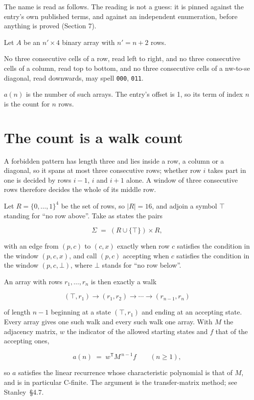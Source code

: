 \documentclass[11pt]{article}
\theoremstyle{definition}
\begin{document}
The name is read as follows. The reading is not a guess: it is pinned against the entry's own published terms, and against an independent enumeration, before anything is proved (Section 7).

Let $A$ be an $n' \times 4$ binary array with $n' = n + 2$ rows.

No three consecutive cells of a row, read left to right, and no three consecutive cells of a column, read top to bottom, and no three consecutive cells of a nw-to-se diagonal, read downwards, may spell \texttt{000}, \texttt{011}.

$a(n)$ is the number of such arrays. The entry's offset is 1, so its term of index $n$ is the count for $n$ rows.

\section{The count is a walk count}

A forbidden pattern has length three and lies inside a row, a column or a diagonal, so it spans at most three consecutive rows; whether row $i$ takes part in one is decided by rows $i-1$, $i$ and $i+1$ alone. A window of three consecutive rows therefore decides the whole of its middle row.

Let $R = \{0,\dots,1\}^{4}$ be the set of rows, so $|R| = 16$, and adjoin a symbol $\top$ standing for ``no row above''. Take as states the pairs

\[\Sigma \;=\; (R \cup \{\top\}) \times R,\]

with an edge from $(p,c)$ to $(c,x)$ exactly when row $c$ satisfies the condition in the window $(p,c,x)$, and call $(p,c)$ accepting when $c$ satisfies the condition in the window $(p,c,\bot)$, where $\bot$ stands for ``no row below''.

An array with rows $r_1,\dots,r_n$ is then exactly a walk

\[(\top,r_1) \to (r_1,r_2) \to \cdots \to (r_{n-1},r_n)\]

of length $n-1$ beginning at a state $(\top,r_1)$ and ending at an accepting state. Every array gives one such walk and every such walk one array. With $M$ the adjacency matrix, $w$ the indicator of the allowed starting states and $f$ that of the accepting ones,

\[a(n) \;=\; w^{\mathsf T} M^{\,n-1} f \qquad (n \ge 1),\]

so $a$ satisfies the linear recurrence whose characteristic polynomial is that of $M$, and is in particular C-finite. The argument is the transfer-matrix method; see Stanley~\S4.7.
\end{document}
